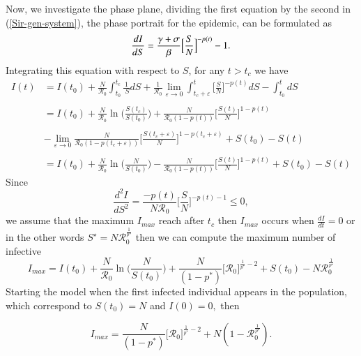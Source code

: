 \documentclass[final,a4paper,reqno]{elsarticle}
\numberwithin{equation}{section}
\begin{document}
\noindent Now, we investigate the phase plane, dividing the first equation  by  the second in (\ref{Sir-gen-system}), the phase portrait
for the epidemic, can be formulated as 
\begin{equation}\label{IS}
\displaystyle \frac{ dI}{dS} = \frac{\gamma+\sigma}{ \beta } \Big[\frac{S}{N}\Big]^{-p(t)}  -1.\\ \\
\end{equation}
Integrating this equation with respect to $S$,  for any $t>t_c$ we have 
\begin{equation}
\begin{array}{ll}
 I (t) &= I(t_0) + \displaystyle   \frac{  N}{\mathcal{R}_0 }  \int^{t_c}_{t_0} \frac{  1}{ \:S} dS+  \frac{  1}{\mathcal{R}_0 } \lim_{\varepsilon \to 0}  \int^t_{t_c+\varepsilon} \Big[\frac{S}{N}\Big]^{-p(t)} dS- \int^{t}_{t_0}  dS \\ \\
 &\displaystyle =  I(t_0) +\frac{N}{\mathcal{R}_0} \ln\Big(\frac{S(t_c)}{S(t_0)}\Big)+\frac{ N}{\mathcal{R}_0 (1-p(t)) } \Big[\frac{S(t)}{N}\Big]^{1-p(t)}\\ \\
 & \displaystyle- \lim_{\varepsilon \to 0}  \frac{ N}{ \mathcal{R}_0 (1-p(t_c+\varepsilon)) } \Big[\frac{S(t_c+\varepsilon)}{N}\Big]^{1-p(t_c+\varepsilon)}+S(t_0)-S(t)\\ \\
 &\displaystyle =  I(t_0) +\frac{N}{\mathcal{R}_0} \ln\Big(\frac{N}{S(t_0)}  \Big) - \frac{ N}{\mathcal{R}_0 (1-p(t)) } \Big[\frac{S(t)}{N}\Big]^{1-p(t)}+S(t_0)-S(t)
\end{array}
\end{equation}
Since $$\displaystyle \frac{ d^2I}{dS^2}  =\frac{-p(t)}{ N \mathcal{R}_0  } \Big[\frac{S}{N}\Big]^{-p(t)-1} \leq 0,$$  we assume that the maximum $ I_{max}$ reach  after $t_c$ then  $I_{max}$ occurs when $\frac{ dI}{dt}=0$ or in the other words $\displaystyle S^\star= N \mathcal{R}_0^{\frac{1}{p^\star}} $ then we can compute the maximum number of infective
 $$ I_{max}=   I(t_0) +\frac{N}{\mathcal{R}_0} \ln\Big(\frac{N}{S(t_0)}  \Big) +\frac{ N}{ (1-p^*) } \Big[\mathcal{R}_0\Big]^{\frac{1}{p^*}-2}+S(t_0)-N \mathcal{R}_0^{\frac{1}{p^\star}}
$$
Starting the model when the first infected
individual appears in the population, which  correspond to 
$ \displaystyle S(t_0)=N$ and  $I(0)=0,$ then

 $$ I_{max}=   \frac{ N}{ (1-p^*) } \Big[\mathcal{R}_0\Big]^{\frac{1}{p^*}-2}+N(1- \mathcal{R}_0^{\frac{1}{p^\star}}).
$$
\end{document}
